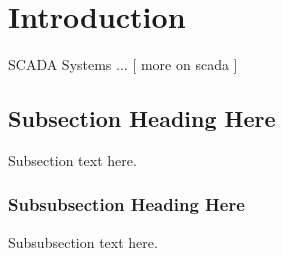 \section{Introduction}
SCADA Systems ... [ more on scada ]



\subsection{Subsection Heading Here}
Subsection text here.


\subsubsection{Subsubsection Heading Here}
Subsubsection text here.
